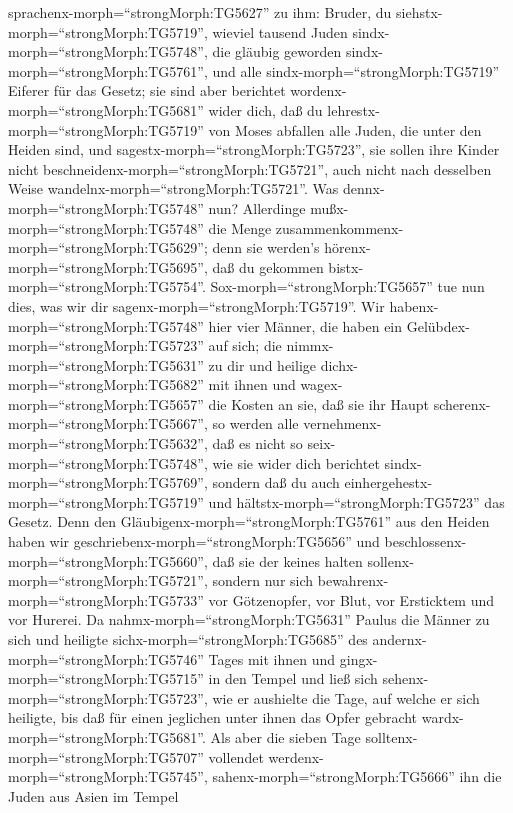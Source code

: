 sprachenx-morph=``strongMorph:TG5627'' zu ihm: Bruder, du
siehstx-morph=``strongMorph:TG5719'', wieviel tausend Juden
sindx-morph=``strongMorph:TG5748'', die gläubig geworden
sindx-morph=``strongMorph:TG5761'', und alle
sindx-morph=``strongMorph:TG5719'' Eiferer für das Gesetz; 
sie sind aber berichtet wordenx-morph=``strongMorph:TG5681'' wider dich,
daß du lehrestx-morph=``strongMorph:TG5719'' von Moses abfallen alle
Juden, die unter den Heiden sind, und
sagestx-morph=``strongMorph:TG5723'', sie sollen ihre Kinder nicht
beschneidenx-morph=``strongMorph:TG5721'', auch nicht nach desselben
Weise wandelnx-morph=``strongMorph:TG5721''.  Was
dennx-morph=``strongMorph:TG5748'' nun? Allerdinge
mußx-morph=``strongMorph:TG5748'' die Menge
zusammenkommenx-morph=``strongMorph:TG5629''; denn sie werden's
hörenx-morph=``strongMorph:TG5695'', daß du gekommen
bistx-morph=``strongMorph:TG5754''. 
Sox-morph=``strongMorph:TG5657'' tue nun dies, was wir dir
sagenx-morph=``strongMorph:TG5719''.  Wir
habenx-morph=``strongMorph:TG5748'' hier vier Männer, die haben ein
Gelübdex-morph=``strongMorph:TG5723'' auf sich; die
nimmx-morph=``strongMorph:TG5631'' zu dir und heilige
dichx-morph=``strongMorph:TG5682'' mit ihnen und
wagex-morph=``strongMorph:TG5657'' die Kosten an sie, daß sie ihr Haupt
scherenx-morph=``strongMorph:TG5667'', so werden alle
vernehmenx-morph=``strongMorph:TG5632'', daß es nicht so
seix-morph=``strongMorph:TG5748'', wie sie wider dich berichtet
sindx-morph=``strongMorph:TG5769'', sondern daß du auch
einhergehestx-morph=``strongMorph:TG5719'' und
hältstx-morph=``strongMorph:TG5723'' das Gesetz.  Denn den
Gläubigenx-morph=``strongMorph:TG5761'' aus den Heiden haben wir
geschriebenx-morph=``strongMorph:TG5656'' und
beschlossenx-morph=``strongMorph:TG5660'', daß sie der keines halten
sollenx-morph=``strongMorph:TG5721'', sondern nur sich
bewahrenx-morph=``strongMorph:TG5733'' vor Götzenopfer, vor Blut, vor
Ersticktem und vor Hurerei.  Da
nahmx-morph=``strongMorph:TG5631'' Paulus die Männer zu sich und
heiligte sichx-morph=``strongMorph:TG5685'' des
andernx-morph=``strongMorph:TG5746'' Tages mit ihnen und
gingx-morph=``strongMorph:TG5715'' in den Tempel und ließ sich
sehenx-morph=``strongMorph:TG5723'', wie er aushielte die Tage, auf
welche er sich heiligte, bis daß für einen jeglichen unter ihnen das
Opfer gebracht wardx-morph=``strongMorph:TG5681''.  Als
aber die sieben Tage solltenx-morph=``strongMorph:TG5707'' vollendet
werdenx-morph=``strongMorph:TG5745'',
sahenx-morph=``strongMorph:TG5666'' ihn die Juden aus Asien im Tempel
